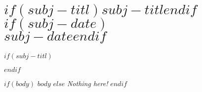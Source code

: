 \chapter*{$if(subj-titl)$\LARGE{$subj-titl$}$endif$ $if(subj-date)$\\ \normalfont\large{\textit{$subj-date$}}$endif$}
$if(subj-titl)$$endif$
\setcounter{section}{0}

$if(body)$
$body$
$else$
\textit{Nothing here!}
$endif$
